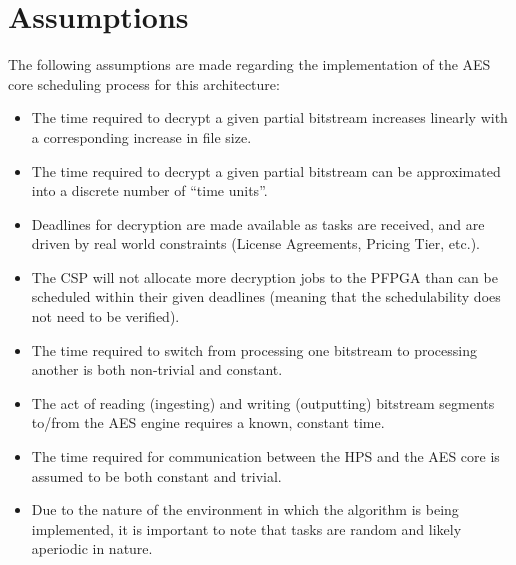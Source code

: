 \section{Assumptions}\label{subsec:EDFAssumptions}
The following assumptions are made regarding the implementation of the AES core scheduling process for this architecture:
\begin{itemize}
    \item The time required to decrypt a given partial bitstream increases linearly with a corresponding increase in file size.
    \item The time required to decrypt a given partial bitstream can be approximated into a discrete number of ``time units''.
    \item Deadlines for decryption are made available as tasks are received, and are driven by real world constraints (License Agreements, Pricing Tier, etc.).
    \item The CSP will not allocate more decryption jobs to the PFPGA than can be scheduled within their given deadlines (meaning that the schedulability does not need to be verified).
    \item The time required to switch from processing one bitstream to processing another is both non-trivial and constant.
    \item The act of reading (ingesting) and writing (outputting) bitstream segments to/from the AES engine requires a known, constant time.
    \item The time required for communication between the HPS and the AES core is assumed to be both constant and trivial.
    \item Due to the nature of the environment in which the algorithm is being implemented, it is important to note that tasks are random and likely aperiodic in nature.
\end{itemize}

